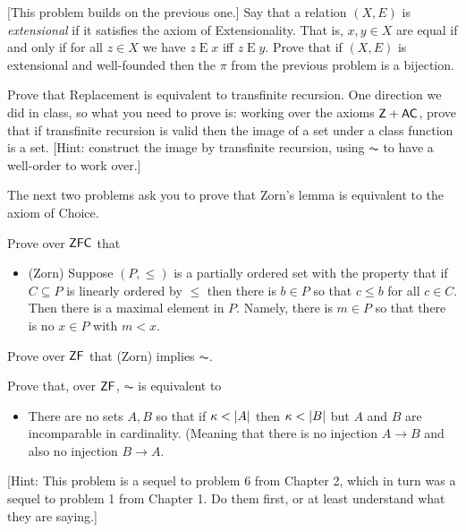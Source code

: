 \documentclass[10pt]{amsart}
\begin{document}
\begin{problem}
{[This problem builds on the previous one.]}
Say that a relation $(X,E)$ is \emph{extensional} if it satisfies the axiom of Extensionality. That is, $x,y \in X$ are equal if and only if for all $z \in X$ we have $z \mathbin E x$ iff $z \mathbin E y$. Prove that if $(X,E)$ is extensional and well-founded then the $\pi$ from the previous problem is a bijection.
\end{problem}

\begin{problem}
Prove that Replacement is equivalent to transfinite recursion. One direction we did in class, so what you need to prove is: working over the axioms $\mathsf{Z} + \mathsf{AC}$, prove that if transfinite recursion is valid then the image of a set under a class function is a set. [Hint: construct the image by transfinite recursion, using $\AC$ to have a well-order to work over.]
\end{problem}

The next two problems ask you to prove that Zorn's lemma is equivalent to the axiom of Choice.

\begin{problem}
Prove over $\mathsf{ZFC}$ that
\begin{itemize}
\item (Zorn) Suppose $(P,\le)$ is a partially ordered set with the property that if $C \subseteq P$ is linearly ordered by $\le$ then there is $b \in P$ so that $c \le b$ for all $c \in C$. Then there is a maximal element in $P$. Namely, there is $m \in P$ so that there is no $x \in P$ with $m < x$.
\end{itemize}
\end{problem}

\begin{problem}
Prove over $\mathsf{ZF}$ that (Zorn) implies $\AC$. 
\end{problem}


\begin{problem}
Prove that, over $\mathsf{ZF}$, $\AC$ is equivalent to
\begin{itemize}
\item There are no sets $A,B$ so that if $\kappa < \left\lvert A \right\rvert$ then $\kappa < \left\lvert B \right\rvert$ but $A$ and $B$ are incomparable in cardinality. (Meaning that there is no injection $A \to B$ and also no injection $B \to A$.
\end{itemize}
[Hint: This problem is a sequel to problem 6 from Chapter 2, which in turn was a sequel to problem 1 from Chapter 1. Do them first, or at least understand what they are saying.]
\end{problem}
\end{document}
